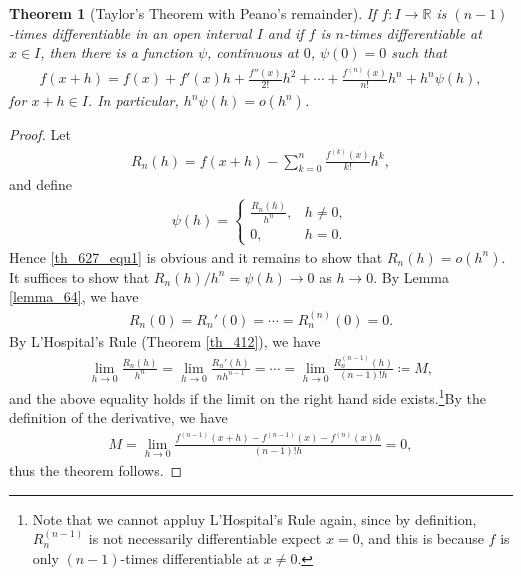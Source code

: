 \documentclass[11pt]{book}
\newtheorem{theorem}{Theorem}[chapter]
\theoremstyle{definition}
\numberwithin{equation}{chapter}
\begin{document}
\medskip

\begin{theorem}[Taylor's Theorem with Peano's remainder]\label{th_627}
If $f: I \to \mathbb{R}$ is $(n-1)$-times differentiable in an open interval $I$ and if $f$ is $n$-times differentiable at $x \in I$, then there is a function $\psi$, continuous at $0$, $\psi(0) = 0$ such that
\begin{align}\label{th_627_equ1}
    f(x + h) = f(x) + f'(x)h + \frac{f''(x)}{2!}h^2 + \cdots + \frac{f^{(n)}(x)}{n!}h^n + h^n \psi(h),
\end{align}
for $x + h \in I$. In particular, $h^n \psi(h) = o(h^n)$.
\end{theorem}
\begin{proof}
Let
\begin{align*}
    R_n(h) = f(x + h) - \sum^n_{k=0} \frac{f^{(k)}(x)}{k!} h^k,
\end{align*}
and define
\begin{align*}
    \psi(h) = \begin{cases}
        \frac{R_n(h)}{h^n}, & h \neq 0, \\
        0, & h = 0.
    \end{cases}
\end{align*}
Hence \eqref{th_627_equ1} is obvious and it remains to show that $R_n(h) = o(h^n)$. It suffices to show that $R_n(h)/h^n = \psi(h) \to 0$ as $h \to 0$. By Lemma \ref{lemma_64}, we have
\begin{align*}
    R_n(0) = R_n'(0) = \cdots = R_n^{(n)}(0) = 0.
\end{align*}
By L'Hospital's Rule (Theorem \ref{th_412}), we have
\begin{align*}
    \lim_{h \to 0} \frac{R_n(h)}{h^n} = \lim_{h \to 0} \frac{R_n'(h)}{nh^{n-1}} = \cdots = \lim_{h \to 0} \frac{R_n^{(n-1)}(h)}{(n-1)!h} \coloneqq M,
\end{align*}
and the above equality holds if the limit on the right hand side exists.\footnote{Note that we cannot appluy L'Hospital's Rule again, since by definition, $R_n^{(n-1)}$ is not necessarily differentiable expect $x = 0$, and this is because $f$ is only $(n-1)$-times differentiable at $x \neq 0$.}By the definition of the derivative, we have
\begin{align*}
    M = \lim_{h \to 0} \frac{f^{(n-1)}(x+h) - f^{(n-1)}(x) - f^{(n)}(x)h}{(n-1)!h} = 0,
\end{align*}
thus the theorem follows.
\end{proof}

\medskip
\end{document}
